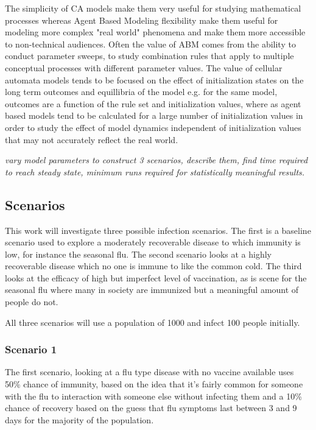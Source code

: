 \documentclass[11pt]{article} %
\begin{document}
The simplicity of CA models make them very useful for studying mathematical processes whereas Agent Based Modeling flexibility make them useful for modeling more complex "real world" phenomena and make them more accessible to non-technical audiences. Often the value of ABM comes from the ability to conduct parameter sweeps, to study combination rules that apply to multiple conceptual processes with different parameter values. The value of cellular automata models tends to be focused on the effect of initialization states on the long term outcomes and equillibria of the model e.g. for the same model, outcomes are a function of the rule set and initialization values, where as agent based models tend to be calculated for a large number of initialization values in order to study the effect of model dynamics independent of initialization values that may not accurately reflect the real world. 

\textit{vary model parameters to construct 3 scenarios, describe them, find time required to reach steady state, minimum runs required for statistically meaningful results.}


\subsection{Scenarios}

This work will investigate three possible infection scenarios. The first is a baseline scenario used to explore a moderately recoverable disease to which immunity is low, for instance the seasonal flu. The second scenario looks at a highly recoverable disease which no one is immune to like the common cold. The third looks at the efficacy of high but imperfect level of vaccination, as is scene for the seasonal flu where many in society are immunized but a meaningful amount of people do not. 

All three scenarios will use a population of 1000 and infect 100 people initially. 

\subsubsection{Scenario 1}


The first scenario, looking at a flu type disease with no vaccine available uses 50\% chance of immunity, based on the idea that it's fairly common for someone with the flu to interaction with someone else without infecting them and a 10\% chance of recovery based on the guess that flu symptoms last between 3 and 9 days for the majority of the population.
\end{document}
